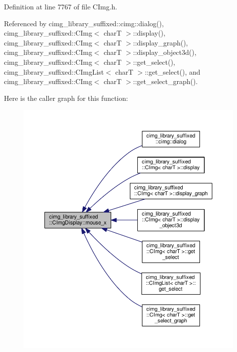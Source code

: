 Definition at line 7767 of file C\+Img.\+h.



Referenced by cimg\+\_\+library\+\_\+suffixed\+::cimg\+::dialog(), cimg\+\_\+library\+\_\+suffixed\+::\+C\+Img$<$ char\+T $>$\+::display(), cimg\+\_\+library\+\_\+suffixed\+::\+C\+Img$<$ char\+T $>$\+::display\+\_\+graph(), cimg\+\_\+library\+\_\+suffixed\+::\+C\+Img$<$ char\+T $>$\+::display\+\_\+object3d(), cimg\+\_\+library\+\_\+suffixed\+::\+C\+Img$<$ char\+T $>$\+::get\+\_\+select(), cimg\+\_\+library\+\_\+suffixed\+::\+C\+Img\+List$<$ char\+T $>$\+::get\+\_\+select(), and cimg\+\_\+library\+\_\+suffixed\+::\+C\+Img$<$ char\+T $>$\+::get\+\_\+select\+\_\+graph().

Here is the caller graph for this function\+:
\nopagebreak
\begin{figure}[H]
\begin{center}
\leavevmode
\includegraphics[width=350pt]{d5/d53/structcimg__library__suffixed_1_1CImgDisplay_aa70a8fffd122d505ff4e3a487c36786a_icgraph}
\end{center}
\end{figure}
\mbox{\label{structcimg__library__suffixed_1_1CImgDisplay_a1ffc2df4868b1ab0c3665e0b8175dd07}} 
